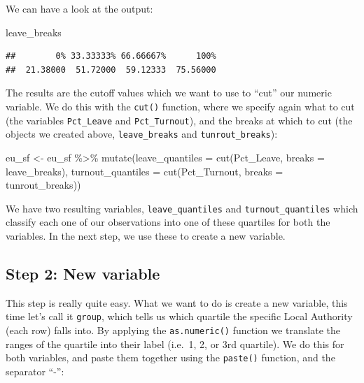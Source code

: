\documentclass[
]{book}
\newenvironment{Shaded}{\begin{snugshade}}{\end{snugshade}}
\newcommand{\AttributeTok}[1]{\textcolor[rgb]{0.77,0.63,0.00}{#1}}
\newcommand{\FunctionTok}[1]{\textcolor[rgb]{0.00,0.00,0.00}{#1}}
\newcommand{\NormalTok}[1]{#1}
\newcommand{\OtherTok}[1]{\textcolor[rgb]{0.56,0.35,0.01}{#1}}
\newcommand{\SpecialCharTok}[1]{\textcolor[rgb]{0.00,0.00,0.00}{#1}}
\begin{document}
We can have a look at the output:

\begin{Shaded}
\begin{Highlighting}[]
\NormalTok{leave\_breaks}
\end{Highlighting}
\end{Shaded}

\begin{verbatim}
##        0% 33.33333% 66.66667%      100% 
##  21.38000  51.72000  59.12333  75.56000
\end{verbatim}

The results are the cutoff values which we want to use to ``cut'' our numeric variable. We do this with the \texttt{cut()} function, where we specify again what to cut (the variables \texttt{Pct\_Leave} and \texttt{Pct\_Turnout}), and the breaks at which to cut (the objects we created above, \texttt{leave\_breaks} and \texttt{tunrout\_breaks}):

\begin{Shaded}
\begin{Highlighting}[]
\NormalTok{eu\_sf }\OtherTok{\textless{}{-}}\NormalTok{ eu\_sf }\SpecialCharTok{\%\textgreater{}\%} 
  \FunctionTok{mutate}\NormalTok{(}\AttributeTok{leave\_quantiles =} \FunctionTok{cut}\NormalTok{(Pct\_Leave, }\AttributeTok{breaks =}\NormalTok{ leave\_breaks), }
         \AttributeTok{turnout\_quantiles =} \FunctionTok{cut}\NormalTok{(Pct\_Turnout, }\AttributeTok{breaks =}\NormalTok{ tunrout\_breaks))}
\end{Highlighting}
\end{Shaded}

We have two resulting variables, \texttt{leave\_quantiles} and \texttt{turnout\_quantiles} which classify each one of our observations into one of these quartiles for both the variables. In the next step, we use these to create a new variable.

\hypertarget{step-2-new-variable}{%
\subsection{Step 2: New variable}\label{step-2-new-variable}}

This step is really quite easy. What we want to do is create a new variable, this time let's call it \texttt{group}, which tells us which quartile the specific Local Authority (each row) falls into. By applying the \texttt{as.numeric()} function we translate the ranges of the quartile into their label (i.e.~1, 2, or 3rd quartile). We do this for both variables, and paste them together using the \texttt{paste()} function, and the separator ``-'':
\end{document}
